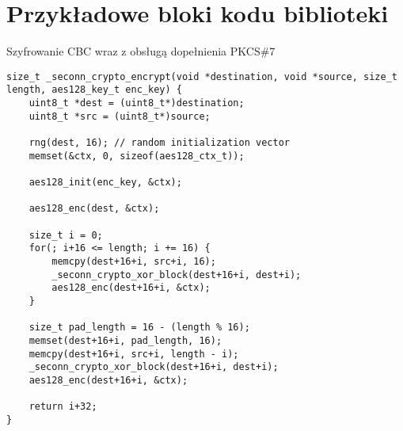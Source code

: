 \chapter{Przykładowe bloki kodu biblioteki}
\label{app:codesamples}




\begin{table}[h]
\caption{Szyfrowanie CBC wraz z obsługą dopełnienia PKCS\#7}
\label{lst:encrypt}
\begin{lstlisting}
size_t _seconn_crypto_encrypt(void *destination, void *source, size_t length, aes128_key_t enc_key) {
    uint8_t *dest = (uint8_t*)destination;
    uint8_t *src = (uint8_t*)source;

    rng(dest, 16); // random initialization vector
    memset(&ctx, 0, sizeof(aes128_ctx_t));

    aes128_init(enc_key, &ctx);

    aes128_enc(dest, &ctx);

    size_t i = 0;
    for(; i+16 <= length; i += 16) {
        memcpy(dest+16+i, src+i, 16);
        _seconn_crypto_xor_block(dest+16+i, dest+i);
        aes128_enc(dest+16+i, &ctx);
    }

    size_t pad_length = 16 - (length % 16);
    memset(dest+16+i, pad_length, 16);
    memcpy(dest+16+i, src+i, length - i);
    _seconn_crypto_xor_block(dest+16+i, dest+i);
    aes128_enc(dest+16+i, &ctx);

    return i+32;
}
\end{lstlisting}
\end{table}

